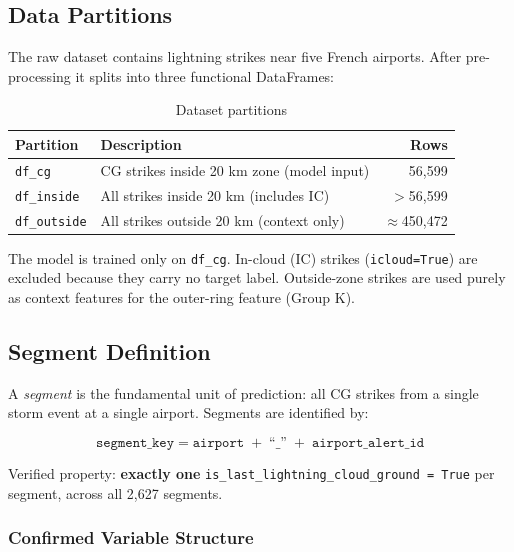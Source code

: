 \documentclass[12pt,a4paper]{article}
\begin{document}
\subsection{Data Partitions}

The raw dataset contains lightning strikes near five French airports.
After pre-processing it splits into three functional DataFrames:

\begin{table}[H]
\centering
\caption{Dataset partitions}
\begin{tabular}{llr}
\toprule
\textbf{Partition} & \textbf{Description} & \textbf{Rows} \\
\midrule
\texttt{df\_cg}      & CG strikes inside 20 km zone (model input) & 56,599 \\
\texttt{df\_inside}  & All strikes inside 20 km (includes IC)      & $>$56,599 \\
\texttt{df\_outside} & All strikes outside 20 km (context only)   & $\approx$450,472 \\
\bottomrule
\end{tabular}
\end{table}

\noindent The model is trained only on \texttt{df\_cg}.
In-cloud (IC) strikes (\texttt{icloud=True}) are excluded because they carry no target label.
Outside-zone strikes are used purely as context features for the outer-ring feature (Group K).

\subsection{Segment Definition}

A \emph{segment} is the fundamental unit of prediction: all CG strikes from a single
storm event at a single airport. Segments are identified by:

\begin{equation}
  \texttt{segment\_key} = \texttt{airport} \;+\; \text{``\_''} \;+\; \texttt{airport\_alert\_id}
\end{equation}

\noindent Verified property: \textbf{exactly one} \texttt{is\_last\_lightning\_cloud\_ground = True}
per segment, across all 2,627 segments.

\subsubsection*{Confirmed Variable Structure}
\end{document}
